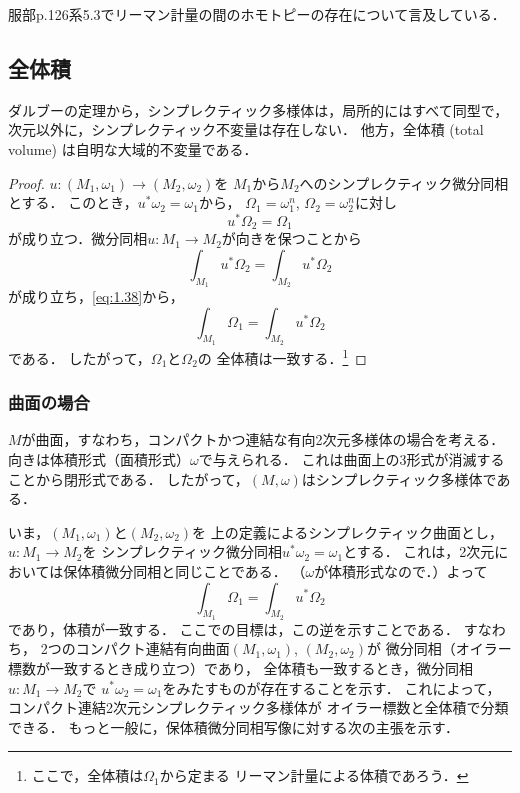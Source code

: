 \begin{CMT}
    服部p.126系5.3でリーマン計量の間のホモトピーの存在について言及している．
\end{CMT}

\subsection*{全体積}
ダルブーの定理から，シンプレクティック多様体は，局所的にはすべて同型で，
次元以外に，シンプレクティック不変量は存在しない．
他方，全体積 (total volume) は自明な大域的不変量である．
\begin{proof}
    \(u\colon (M_1,\omega_1) \to (M_2,\omega_2)\)を
    \(M_1\)から\(M_2\)へのシンプレクティック微分同相とする．
    このとき，\(u^{\ast}\omega_2=\omega_1\)から，
    \(\varOmega_1=\omega_1^n\), \(\varOmega_2=\omega_2^n\)に対し
    \begin{equation}
        u^{\ast}\varOmega_2=\varOmega_1\label{eq:1.38}
    \end{equation}
    が成り立つ．微分同相\(u\colon M_1\to M_2\)が向きを保つことから
    \[
        \int_{M_1}^{}u^{\ast}\varOmega_{2}=
        \int_{M_2}^{}u^{\ast}\varOmega_{2}
    \]が成り立ち，\eqref{eq:1.38}から，
    \[
        \int_{M_1}^{}\varOmega_{1}=
        \int_{M_2}^{}u^{\ast}\varOmega_{2}
    \]
    である．
    したがって，\(\varOmega_{1}\)と\(\varOmega_{2}\)の
    全体積は一致する．\footnote{
        ここで，全体積は\(\varOmega_1\)から定まる
        リーマン計量による体積であろう．
    }
\end{proof}
\subsubsection*{曲面の場合}
\(M\)が曲面，すなわち，コンパクトかつ連結な有向2次元多様体の場合を考える．
向きは体積形式（面積形式）\(\omega\)で与えられる．
これは曲面上の\(3\)形式が消滅することから閉形式である．
したがって，\((M,\omega)\)はシンプレクティック多様体である．

いま，\((M_1,\omega_1)\)と\((M_2,\omega_2)\)を
上の定義によるシンプレクティック曲面とし，\(u\colon M_1\to M_2\)を
シンプレクティック微分同相\(u^{\ast}\omega_2=\omega_1\)とする．
これは，2次元においては保体積微分同相と同じことである．
（\(\omega\)が体積形式なので．）よって\begin{equation}
    \int_{M_1}^{}\varOmega_{1}=
    \int_{M_2}^{}u^{\ast}\varOmega_{2}
\end{equation}
であり，体積が一致する．
ここでの目標は，この逆を示すことである．
すなわち，
2つのコンパクト連結有向曲面\((M_1,\omega_1)\), \((M_2,\omega_2)\)が
微分同相（オイラー標数が一致するとき成り立つ）であり，
全体積も一致するとき，微分同相\(u\colon M_1\to M_2\)で
\(u^{\ast}\omega_2=\omega_1\)をみたすものが存在することを示す．
これによって，コンパクト連結2次元シンプレクティック多様体が
オイラー標数と全体積で分類できる．
もっと一般に，保体積微分同相写像に対する次の主張を示す．

